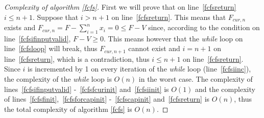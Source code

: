 \begin{proof}[Complexity of algorithm \ref{fcfs}]
   First we will prove that on line~\ref{fcfsreturn} $i \leq n+1$. Suppose that $i > n+1$ on line~\ref{fcfsreturn}. This
   means that $F_{cur,n}$ exists and $F_{cur,n} = F - \sum\limits_{i=1}^{n}x_i = 0 \leq F - V$ since, according to the
   condition on line~\ref{fcfsifinputvalid}, $F - V \geq 0$. This means however that the \emph{while} loop on
   line~\ref{fcfsloop} will break, thus $F_{cur,n+1}$ cannot exist and $i = n + 1$ on line~\ref{fcfsreturn}, which is a
   contradiction, thus $i \leq n+1$ on line~\ref{fcfsreturn}. Since $i$ is incremented by 1 on every iteration of the
   \emph{while} loop (line~\ref{fcfsiinc}), the complexity of the \emph{while} loop is $O(n)$ in the worst case. The
   complexity of lines~\ref{fcfsifinputvalid} -~\ref{fcfsfcurinit} and~\ref{fcfsiinit} is $O(1)$ and the complexity of
   lines~\ref{fcfsfinit},~\ref{fcfsforcapinit} -~\ref{fcfscapinit} and~\ref{fcfsreturn} is $O(n)$, thus the total
   complexity of algorithm \ref{fcfs} is $O(n)$.
\end{proof}
